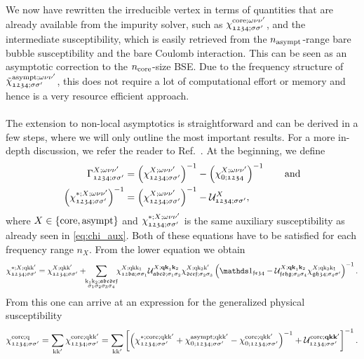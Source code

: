 \documentclass[../../main.tex]{subfiles}
\begin{document}
We now have rewritten the irreducible vertex in terms of quantities that are already available from the impurity solver, such as $\chi_{\mathfrak{1234};\ss'}^{\core;\omega\nu\nu'}$, and the intermediate susceptibility, which is easily retrieved from the $n_{\asympt}$-range bare bubble susceptibility and the bare Coulomb interaction. This can be seen as an asymptotic correction to the $n_{\core}$-size BSE. Due to the frequency structure of $\tilde\chi_{\mathfrak{1234};\ss'}^{\asympt;\omega\nu\nu'}$, this does not require a lot of computational effort or memory and hence is a very resource efficient approach.
\\\\
The extension to non-local asymptotics is straightforward and can be derived in a few steps, where we will only outline the most important results. For a more in-depth discussion, we refer the reader to Ref.~\cite{Kitatani2022}. At the beginning, we define
\begin{align}
	\Gamma_{\mathfrak{1234};\ss'}^{X;\omega\nu\nu'}&=\left (\chi_{\mathfrak{1234};\ss'}^{X;\omega\nu\nu'}\right )^{-1}-\left (\chi_{0;\mathfrak{1234}}^{X;\omega\nu\nu'}\right )^{-1} \qqand\\
	\left (\chi_{\mathfrak{1234};\ss'}^{*;X;\omega\nu\nu'}\right )^{-1}&=\left (\chi_{\mathfrak{1234};\ss'}^{X;\omega\nu\nu'}\right )^{-1}-\mathcal{U}_{\mathfrak{1234};\ss'}^{X},
\end{align}
where $X\in\{\core,\asympt\}$ and $\chi_{\mathfrak{1234};\ss'}^{*;X;\omega\nu\nu'}$ is the same auxiliary susceptibility as already seen in \eqref{eq:chi_aux}. Both of these equations have to be satisfied for each frequency range $n_{X}$. From the lower equation we obtain \cite{Kitatani2022}
\begin{align}
	\chi_{\mathfrak{1234};\ss'}^{*;X;\q\k\kp}=\chi_{\mathfrak{1234};\ss'}^{X;\q\k\kp}+\!\! \sum_{\substack{\k_1\k_2;\mathfrak{abcdef}\\\sigma_1\sigma_2\sigma_3\sigma_4}}\!\! \chi_{\mathfrak{12ba};\ss_1}^{X;\q\k\k_1} \mathcal{U}^{X;\vv{qk}_1\vv{k}_2}_{\mathfrak{abcd};\sigma_1\sigma_2} \chi_{\mathfrak{dcef};\sigma_2\sigma_3}^{X;\q\k_2\kp}\left (\unity_{\mathfrak{fe34}} - \mathcal{U}^{X;\vv{qk}_1\vv{k}_2}_{\mathfrak{fehg};\sigma_3\sigma_4}\chi^{X;\q\k_2\k_1}_{\mathfrak{gh34};\sigma_4\sigma'}\right )^{-1}.
\end{align}
From this one can arrive at an expression for the generalized physical susceptibility \cite{Kitatani2022}
\begin{align}\label{eq:chi_phys_asympt}
	\chi_{\mathfrak{1234};\ss'}^{\core;\q}=\sum_{\k\kp}\chi_{\mathfrak{1234};\ss'}^{\core;\q\k\kp}=\sum_{\k\kp}\left [\left (\chi_{\mathfrak{1234};\ss'}^{*;\core;\q\k\kp}+\chi_{0;\mathfrak{1234};\ss'}^{\asympt;\q\k\kp}-\chi_{0;\mathfrak{1234};\ss'}^{\core;\q\k\kp}\right )^{-1}+\mathcal{U}_{\mathfrak{1234};\ss'}^{\core;\vv{qkk}'}\right ]^{-1}.
\end{align}
\end{document}
